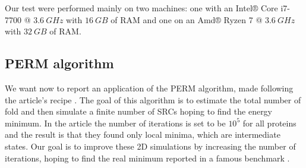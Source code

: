 Our test were performed mainly on two machines: one with an Intel® Core i7-7700 @ $3.6 \ GHz$ with $16 \ GB$ of RAM and one on an Amd® Ryzen 7 @ $3.6 \ GHz$ with $32 \ GB$ of RAM.
\subsection{PERM algorithm}
We want now to report an application of the PERM algorithm, made following the article's recipe \cite{PERM}.
The goal of this algorithm is to estimate the total number of fold and then simulate a finite number of SRCs hoping to find the energy minimum.
In the article the number of iterations is set to be $10^5$ for all proteins and the result is that they found only local minima, which are intermediate states.
Our goal is to improve these 2D simulations by increasing the number of iterations, hoping to find the real minimum reported in a famous benchmark \cite{bench}.

